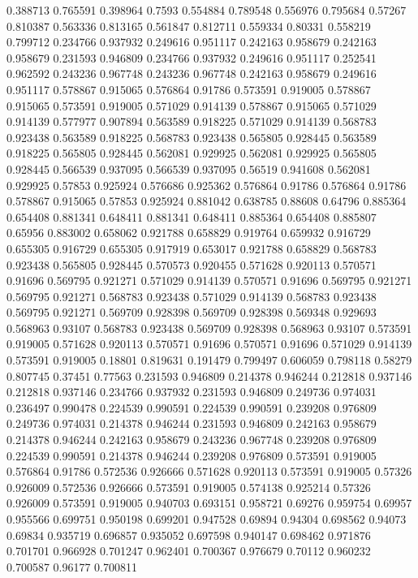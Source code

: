 0.388713 0.765591
0.398964 0.7593
0.554884 0.789548
0.556976 0.795684
0.57267 0.810387
0.563336 0.813165
0.561847 0.812711
0.559334 0.80331
0.558219 0.799712
0.234766 0.937932
0.249616 0.951117
0.242163 0.958679
0.242163 0.958679
0.231593 0.946809
0.234766 0.937932
0.249616 0.951117
0.252541 0.962592
0.243236 0.967748
0.243236 0.967748
0.242163 0.958679
0.249616 0.951117
0.578867 0.915065
0.576864 0.91786
0.573591 0.919005
0.578867 0.915065
0.573591 0.919005
0.571029 0.914139
0.578867 0.915065
0.571029 0.914139
0.577977 0.907894
0.563589 0.918225
0.571029 0.914139
0.568783 0.923438
0.563589 0.918225
0.568783 0.923438
0.565805 0.928445
0.563589 0.918225
0.565805 0.928445
0.562081 0.929925
0.562081 0.929925
0.565805 0.928445
0.566539 0.937095
0.566539 0.937095
0.56519 0.941608
0.562081 0.929925
0.57853 0.925924
0.576686 0.925362
0.576864 0.91786
0.576864 0.91786
0.578867 0.915065
0.57853 0.925924
0.881042 0.638785
0.88608 0.64796
0.885364 0.654408
0.881341 0.648411
0.881341 0.648411
0.885364 0.654408
0.885807 0.65956
0.883002 0.658062
0.921788 0.658829
0.919764 0.659932
0.916729 0.655305
0.916729 0.655305
0.917919 0.653017
0.921788 0.658829
0.568783 0.923438
0.565805 0.928445
0.570573 0.920455
0.571628 0.920113
0.570571 0.91696
0.569795 0.921271
0.571029 0.914139
0.570571 0.91696
0.569795 0.921271
0.569795 0.921271
0.568783 0.923438
0.571029 0.914139
0.568783 0.923438
0.569795 0.921271
0.569709 0.928398
0.569709 0.928398
0.569348 0.929693
0.568963 0.93107
0.568783 0.923438
0.569709 0.928398
0.568963 0.93107
0.573591 0.919005
0.571628 0.920113
0.570571 0.91696
0.570571 0.91696
0.571029 0.914139
0.573591 0.919005
0.18801 0.819631
0.191479 0.799497
0.606059 0.798118
0.58279 0.807745
0.37451 0.77563
0.231593 0.946809
0.214378 0.946244
0.212818 0.937146
0.212818 0.937146
0.234766 0.937932
0.231593 0.946809
0.249736 0.974031
0.236497 0.990478
0.224539 0.990591
0.224539 0.990591
0.239208 0.976809
0.249736 0.974031
0.214378 0.946244
0.231593 0.946809
0.242163 0.958679
0.214378 0.946244
0.242163 0.958679
0.243236 0.967748
0.239208 0.976809
0.224539 0.990591
0.214378 0.946244
0.239208 0.976809
0.573591 0.919005
0.576864 0.91786
0.572536 0.926666
0.571628 0.920113
0.573591 0.919005
0.57326 0.926009
0.572536 0.926666
0.573591 0.919005
0.574138 0.925214
0.57326 0.926009
0.573591 0.919005
0.940703 0.693151
0.958721 0.69276
0.959754 0.69957
0.955566 0.699751
0.950198 0.699201
0.947528 0.69894
0.94304 0.698562
0.94073 0.69834
0.935719 0.696857
0.935052 0.697598
0.940147 0.698462
0.971876 0.701701
0.966928 0.701247
0.962401 0.700367
0.976679 0.70112
0.960232 0.700587
0.96177 0.700811

